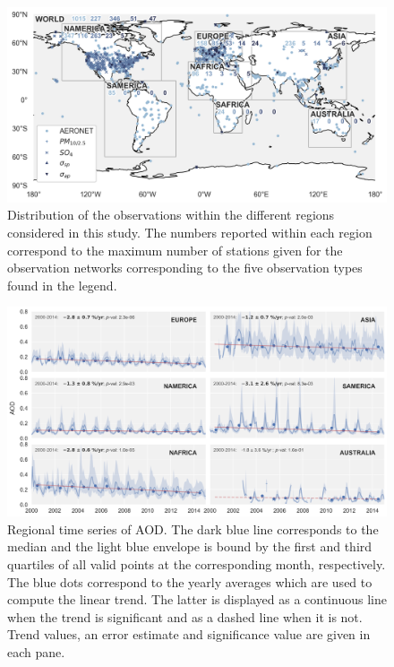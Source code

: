 \documentclass[acp, manuscript]{copernicus}
\begin{document}
\clearpage
\begin{figure}
 \includegraphics[width=12cm]{Figures/Figure2.png}
 \caption{Distribution of the observations within the different regions considered in this study. The numbers reported within each region correspond to the maximum number of stations given for the observation networks corresponding to the five observation types found in the legend.}
 \label{fig:map_obs}
\end{figure}

\clearpage
\begin{figure}
 \includegraphics[width=16cm]{Figures/Figure3.png}
 \caption{Regional time series of AOD. The dark blue line corresponds to the median and the light blue envelope is bound by the first and third quartiles of all valid points at the corresponding month, respectively. The blue dots correspond to the yearly averages which are used to compute the linear trend. The latter is displayed as a continuous line when the trend is significant and as a dashed line when it is not. Trend values, an error estimate and significance value are given in each pane.}
 \label{fig:ts_aod}
\end{figure}
\end{document}
